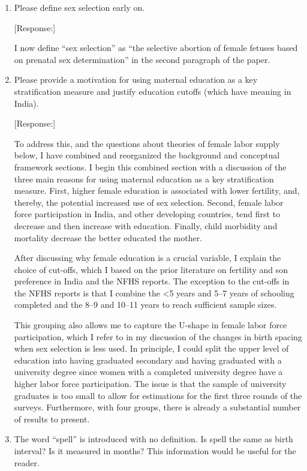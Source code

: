 \documentclass[letterpaper,12pt]{article}
\begin{document}
\begin{enumerate}
\item Please define sex selection early on.

[Response:] 

I now define ``sex selection'' as ``the selective abortion of female fetuses 
based on prenatal sex determination'' in the second paragraph of the paper.


\item Please provide a motivation for using maternal education as a key
stratification measure and justify education cutoffs (which have meaning
in India).

[Response:] 

To address this, and the questions about theories of female labor supply below, I have
combined and reorganized the background and conceptual framework sections.
I begin this combined section with a discussion of the three main reasons for using 
maternal education as a key stratification measure.
First, higher female education is associated with lower fertility, and, thereby, the 
potential increased use of sex selection. 
Second, female labor force participation in India, and other developing countries, 
tend first to decrease and then increase with education. 
Finally, child morbidity and mortality decrease the better educated the mother.


After discussing why female education is a crucial variable, I explain the choice of 
cut-offs, which I based on the prior literature on fertility and son preference in India 
and the NFHS reports.
The exception to the cut-offs in the NFHS reports is that I combine
the <5 years and 5--7 years of schooling completed and 
the 8--9 and 10--11 years to reach sufficient sample sizes.

This grouping also allows me to capture the U-shape in female labor force participation,
which I refer to in my discussion of the changes in birth spacing when sex selection
is less used.
In principle, I could split the upper level of education into having graduated secondary 
and having graduated with a university degree since women with a completed university 
degree have a higher labor force participation. 
The issue is that the sample of university graduates is too small to allow for estimations 
for the first three rounds of the surveys. 
Furthermore, with four groups, there is already a substantial number of results to present.


\item The word ``spell'' is introduced with no definition. Is spell the
same as birth interval? Is it measured in months? This information would
be useful for the reader.


\end{enumerate}
\end{document}
